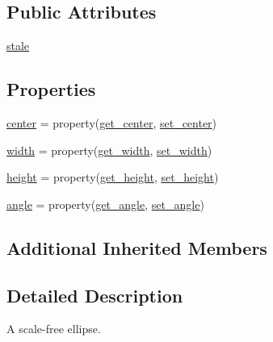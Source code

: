 \subsection*{Public Attributes}
\begin{DoxyCompactItemize}
\item 
\hyperlink{classmatplotlib_1_1patches_1_1Ellipse_a068744635d39672052af5798c711d6a1}{stale}
\end{DoxyCompactItemize}
\subsection*{Properties}
\begin{DoxyCompactItemize}
\item 
\hyperlink{classmatplotlib_1_1patches_1_1Ellipse_a34601af3e7015cd52ac102f1e9a5ff49}{center} = property(\hyperlink{classmatplotlib_1_1patches_1_1Ellipse_a0bced80a110919f884e374422801d013}{get\+\_\+center}, \hyperlink{classmatplotlib_1_1patches_1_1Ellipse_a7a9e42cd894c8f85917e940ea84fc1e3}{set\+\_\+center})
\item 
\hyperlink{classmatplotlib_1_1patches_1_1Ellipse_a60c9f834917ca71a1ca9f92d6e5b7986}{width} = property(\hyperlink{classmatplotlib_1_1patches_1_1Ellipse_a6ce07595904968e01631afe4f8fa467b}{get\+\_\+width}, \hyperlink{classmatplotlib_1_1patches_1_1Ellipse_a550e52dde5db8ebd22b17735c96ae4cf}{set\+\_\+width})
\item 
\hyperlink{classmatplotlib_1_1patches_1_1Ellipse_a0f3d6d29727e93758c785abd6b14abea}{height} = property(\hyperlink{classmatplotlib_1_1patches_1_1Ellipse_ac8e48dc5addbe0eeca0ee76f6d567397}{get\+\_\+height}, \hyperlink{classmatplotlib_1_1patches_1_1Ellipse_a1e9e57643cbc37eb5482b0872b743604}{set\+\_\+height})
\item 
\hyperlink{classmatplotlib_1_1patches_1_1Ellipse_a36ada1e22adc07aa2c4a753a272f8f62}{angle} = property(\hyperlink{classmatplotlib_1_1patches_1_1Ellipse_ab1ccd52d00ba28b6443813c49722e726}{get\+\_\+angle}, \hyperlink{classmatplotlib_1_1patches_1_1Ellipse_a2562682ddf50cd3923c9ebf221cb46e4}{set\+\_\+angle})
\end{DoxyCompactItemize}
\subsection*{Additional Inherited Members}


\subsection{Detailed Description}
\begin{DoxyVerb}A scale-free ellipse.\end{DoxyVerb}
 

